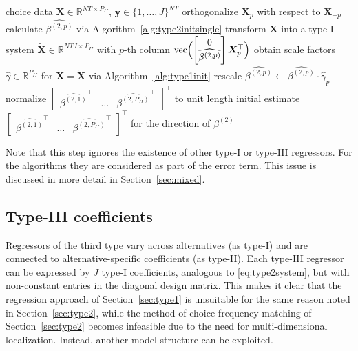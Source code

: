 \documentclass[preprint,12pt,authoryear]{elsarticle}
\newcommand{\R}{\mathbb{R}}
\begin{document}
\begin{algorithm}[htb]
  \caption{Initial estimates for multiple type-II coefficients.}
  \label{alg:type2init}
  \begin{algorithmic}[1]
    \REQUIRE choice data $\bm{X} \in \R^{NT \times P_{II}}$, $\bm{y} \in \{1,\dots,J\}^{NT}$
      \STATE orthogonalize $\bm{X}_{p}$ with respect to $\bm{X}_{-p}$
      \STATE calculate $\widehat{\beta^{(2,p)}}$ via Algorithm~\ref{alg:type2initsingle}
    \ENDFOR
    \STATE transform $\bm{X}$ into a type-I system $\tilde{\bm{X}} \in \R^{NTJ \times P_{II}}$ with $p$-th column ${\operatorname{vec}\Bigl(\begin{bmatrix} 0 \\ \widehat{\beta^{(2,p)}} \end{bmatrix} \bm{X}_{p}^\top\Bigr)}$
    \STATE obtain scale factors $\hat{\gamma} \in \R^{P_{II}}$ for $\bm{X} = \tilde{\bm{X}}$ via Algorithm~\ref{alg:type1init}
      \STATE rescale $\widehat{\beta^{(2,p)}} \leftarrow \widehat{\beta^{(2,p)}} \cdot \hat{\gamma}_p$
    \ENDFOR
    \STATE normalize $\begin{bmatrix} {\widehat{\beta^{(2,1)}}}^\top & \dots & {\widehat{\beta^{(2,P_{II})}}}^\top \end{bmatrix}^\top$ to unit length
    \ENSURE initial estimate $\begin{bmatrix} {\widehat{\beta^{(2,1)}}}^\top & \dots & {\widehat{\beta^{(2,P_{II})}}}^\top \end{bmatrix}^\top$ for the direction of $\beta^{(2)}$
  \end{algorithmic}
\end{algorithm}

Note that this step ignores the existence of other type-I or type-III regressors. For the algorithms they are considered as part of the error term. This issue is discussed in more detail in Section~\ref{sec:mixed}.

\subsection{Type-III coefficients}\label{sec:type3}

Regressors of the third type vary across alternatives (as type-I) and are connected to alternative-specific coefficients (as type-II). Each type-III regressor can be expressed by $J$ type-I coefficients, analogous to \eqref{eq:type2system}, but with non-constant entries in the diagonal design matrix. This makes it clear that the regression approach of Section~\ref{sec:type1} is unsuitable for the same reason noted in Section~\ref{sec:type2}, while the method of choice frequency matching of Section~\ref{sec:type2} becomes infeasible due to the need for multi-dimensional localization. Instead, another model structure can be exploited.
\end{document}
